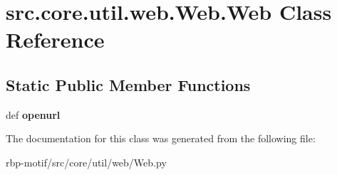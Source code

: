 \hypertarget{classsrc_1_1core_1_1util_1_1web_1_1Web_1_1Web}{\section{src.\-core.\-util.\-web.\-Web.\-Web Class Reference}
\label{classsrc_1_1core_1_1util_1_1web_1_1Web_1_1Web}
}
\subsection*{Static Public Member Functions}
\begin{DoxyCompactItemize}
\item 
\hypertarget{classsrc_1_1core_1_1util_1_1web_1_1Web_1_1Web_ab4c0abe64d2237dd126f4020f46bb560}{def {\bfseries openurl}}\label{classsrc_1_1core_1_1util_1_1web_1_1Web_1_1Web_ab4c0abe64d2237dd126f4020f46bb560}

\end{DoxyCompactItemize}


The documentation for this class was generated from the following file\-:\begin{DoxyCompactItemize}
\item 
rbp-\/motif/src/core/util/web/Web.\-py\end{DoxyCompactItemize}
